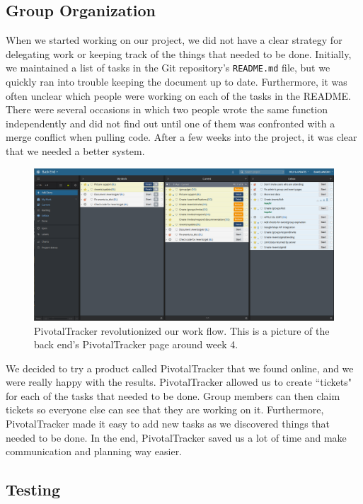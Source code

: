 \documentclass[12pt]{article}
\begin{document}
\subsection{Group Organization}

When we started working on our project, we did not have a clear strategy for 
delegating work or keeping track of the things that needed to be done.
Initially, we maintained a list of tasks in the Git repository's \texttt{README.md} file,
but we quickly ran into trouble keeping the document up to date.
Furthermore, it was often unclear which people were working on each of the tasks in the README.
There were several occasions in which two people wrote the same function independently
and did not find out until one of them was confronted with a merge conflict when pulling code.
After a few weeks into the project, it was clear that we needed a better system.

\begin{figure}
    \centering
    \includegraphics[scale=0.3]{pivotaltracker.png}
    \caption{
        PivotalTracker revolutionized our work flow. 
        This is a picture of the back end's PivotalTracker page around week 4.
    }
    \label{fig:pivotaltracker}
\end{figure}

We decided to try a product called PivotalTracker that we found online,
and we were really happy with the results.
PivotalTracker allowed us to create ``tickets" for each of the tasks that needed to be done.
Group members can then claim tickets so everyone else can see that they are working on it.
Furthermore, PivotalTracker made it easy to add new tasks as we discovered things that needed to be done.
In the end, PivotalTracker saved us a lot of time and make communication and planning way easier.

\subsection{Testing}
\end{document}
